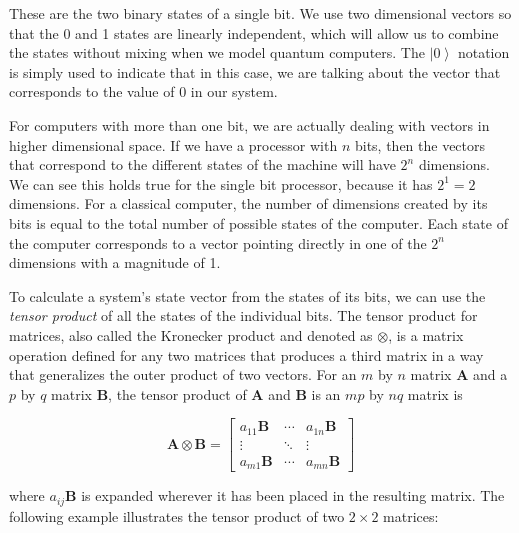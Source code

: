 \documentclass[11pt]{report}
\newcommand{\?}{\stackrel{?}{=}}
\begin{document}
These are the two binary states of a single bit. We use two dimensional vectors so that the 0 and 1 states are linearly independent, which will allow us to combine the states without mixing when we model quantum computers. The $\left | 0 \right \rangle$ notation is simply used to indicate that in this case, we are talking about the vector that corresponds to the value of 0 in our system. 

For computers with more than one bit, we are actually dealing with vectors in higher dimensional space. If we have a processor with $n$ bits, then the vectors that correspond to the different states of the machine will have $2^n$ dimensions. We can see this holds true for the single bit processor, because it has $2^1=2$ dimensions. For a classical computer, the number of dimensions created by its bits is equal to the total number of possible states of the computer. Each state of the computer corresponds to a vector pointing directly in one of the $2^n$ dimensions with a magnitude of 1.

To calculate a system's state vector from the states of its bits, we can use the \textit{tensor product} of all the states of the individual bits. The tensor product for matrices, also called the Kronecker product and denoted as $\otimes$, is a matrix operation defined for any two matrices that produces a third matrix in a way that generalizes the outer product of two vectors. For an $m$ by $n$ matrix $\mathbf{A}$ and a $p$ by $q$ matrix $\mathbf{B}$, the tensor product of $\mathbf{A}$ and $\mathbf{B}$ is an $mp$ by $nq$ matrix is

$$\mathbf{A}\otimes\mathbf{B} = \begin{bmatrix} a_{11} \mathbf{B} & \cdots & a_{1n}\mathbf{B} \\ \vdots & \ddots & \vdots \\ a_{m1} \mathbf{B} & \cdots & a_{mn} \mathbf{B} \end{bmatrix}$$

where $a_{ij}\mathbf{B}$ is expanded wherever it has been placed in the resulting matrix. The following example illustrates the tensor product of two $2\times2$ matrices:
\end{document}
